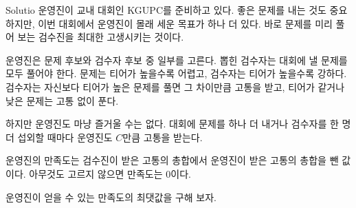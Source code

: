 Solutio 운영진이 교내 대회인 KGUPC를 준비하고 있다. 좋은 문제를 내는 것도 중요하지만, 이번 대회에서 운영진이 몰래 세운 목표가 하나 더 있다. 바로 문제를 미리 풀어 보는 검수진을 최대한 고생시키는 것이다.

운영진은 문제 후보와 검수자 후보 중 일부를 고른다. 뽑힌 검수자는 대회에 낼 문제를 모두 풀어야 한다. 문제는 티어가 높을수록 어렵고, 검수자는 티어가 높을수록 강하다. 검수자는 자신보다 티어가 높은 문제를 풀면 그 차이만큼 고통을 받고, 티어가 같거나 낮은 문제는 고통 없이 푼다.

하지만 운영진도 마냥 즐거울 수는 없다. 대회에 문제를 하나 더 내거나 검수자를 한 명 더 섭외할 때마다 운영진도 $C$만큼 고통을 받는다.

운영진의 만족도는 검수진이 받은 고통의 총합에서 운영진이 받은 고통의 총합을 뺀 값이다. 아무것도 고르지 않으면 만족도는 $0$이다.

운영진이 얻을 수 있는 만족도의 최댓값을 구해 보자.